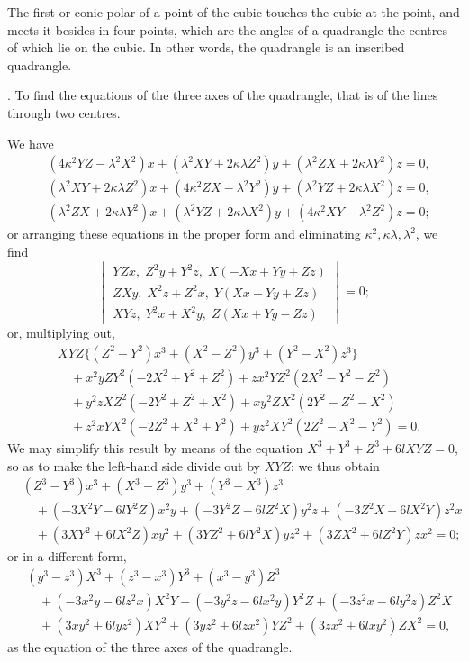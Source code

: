 \documentclass[11pt]{article}
\begin{document}
The first or conic polar of a point of the cubic touches the cubic at the point, and meets it besides in four points, which are the angles of a quadrangle the centres of which lie on the cubic. In other words, the quadrangle is an inscribed quadrangle.

\medskip

. To find the equations of the three axes of the quadrangle, that is of the lines through two centres.

We have
\begin{align*}
&(4 \kappa^2 Y Z - \lambda^2 X^2) x + (\lambda^2 X Y + 2 \kappa\lambda Z^2) y + (\lambda^2 Z X + 2 \kappa\lambda Y^2) z = 0, \\
&(\lambda^2 X Y + 2 \kappa\lambda Z^2) x + (4 \kappa^2 Z X - \lambda^2 Y^2) y + (\lambda^2 Y Z + 2 \kappa\lambda X^2) z = 0, \\
&(\lambda^2 Z X + 2 \kappa\lambda Y^2) x + (\lambda^2 Y Z + 2 \kappa\lambda X^2) y + (4 \kappa^2 X Y - \lambda^2 Z^2) z = 0;
\end{align*}
or arranging these equations in the proper form and eliminating $\kappa^2, \kappa\lambda, \lambda^2$, we find
\[
\begin{vmatrix}
Y Z x,\; Z^2 y + Y^2 z,\; X(-X x + Y y + Z z) \\
Z X y,\; X^2 z + Z^2 x,\; Y( X x - Y y + Z z) \\
X Y z,\; Y^2 x + X^2 y,\; Z( X x + Y y - Z z)
\end{vmatrix} = 0;
\]
or, multiplying out,
\begin{align*}
&X Y Z\bigl\{(Z^2 - Y^2) x^3 + (X^2 - Z^2) y^3 + (Y^2 - X^2) z^3\bigr\} \\
&\quad + x^2 y Z Y^2 (-2 X^2 + Y^2 + Z^2) + z x^2 Y Z^2 (2 X^2 - Y^2 - Z^2) \\
&\quad + y^2 z X Z^2 (-2 Y^2 + Z^2 + X^2) + x y^2 Z X^2 (2 Y^2 - Z^2 - X^2) \\
&\quad + z^2 x Y X^2 (-2 Z^2 + X^2 + Y^2) + y z^2 X Y^2 (2 Z^2 - X^2 - Y^2) = 0.
\end{align*}
We may simplify this result by means of the equation $X^3 + Y^3 + Z^3 + 6 l X Y Z = 0$, so as to make the left-hand side divide out by $X Y Z$: we thus obtain
\begin{align*}
&(Z^3 - Y^3) x^3 + (X^3 - Z^3) y^3 + (Y^3 - X^3) z^3 \\
&\quad + (-3 X^2 Y - 6 l Y^2 Z) x^2 y + (-3 Y^2 Z - 6 l Z^2 X) y^2 z + (-3 Z^2 X - 6 l X^2 Y) z^2 x \\
&\quad + (3 X Y^2 + 6 l X^2 Z) x y^2 + (3 Y Z^2 + 6 l Y^2 X) y z^2 + (3 Z X^2 + 6 l Z^2 Y) z x^2 = 0;
\end{align*}
or in a different form,
\begin{align*}
&(y^3 - z^3) X^3 + (z^3 - x^3) Y^3 + (x^3 - y^3) Z^3 \\
&\quad + (-3 x^2 y - 6 l z^2 x) X^2 Y + (-3 y^2 z - 6 l x^2 y) Y^2 Z + (-3 z^2 x - 6 l y^2 z) Z^2 X \\
&\quad + ( 3 x y^2 + 6 l y z^2) X Y^2 + ( 3 y z^2 + 6 l z x^2) Y Z^2 + ( 3 z x^2 + 6 l x y^2) Z X^2 = 0,
\end{align*}
as the equation of the three axes of the quadrangle.
\end{document}
